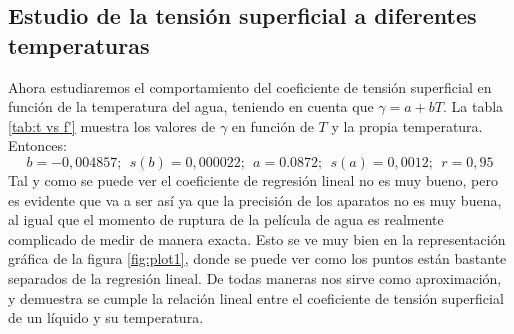 \documentclass[10pt,a4paper]{article}
\begin{document}
\subsection{Estudio de la tensión superficial a diferentes temperaturas}
Ahora estudiaremos el comportamiento del coeficiente de tensión superficial en función de la temperatura del agua, teniendo en cuenta que $\gamma = a + bT$. La tabla \ref{tab:t vs f'} muestra los valores de $\gamma$ en función de $T$  y la propia temperatura. Entonces:
$$ b=-0,004857;\ \ s(b)= 0,000022;\ \ a=0.0872;\ \ s(a)=	0,0012;\ \ r=0,95 $$
Tal y como se puede ver el coeficiente de regresión lineal no es muy bueno, pero es evidente que va a ser así ya que la precisión de los aparatos no es muy buena, al igual que el momento de ruptura de la película de agua es realmente complicado de medir de manera exacta. Esto  se ve muy bien en la representación gráfica de la figura \ref{fig:plot1}, donde se puede ver como los puntos están bastante separados de la regresión lineal. De todas maneras nos sirve como aproximación, y demuestra se cumple la relación lineal entre el coeficiente de tensión superficial de un líquido y su temperatura.
\end{document}
